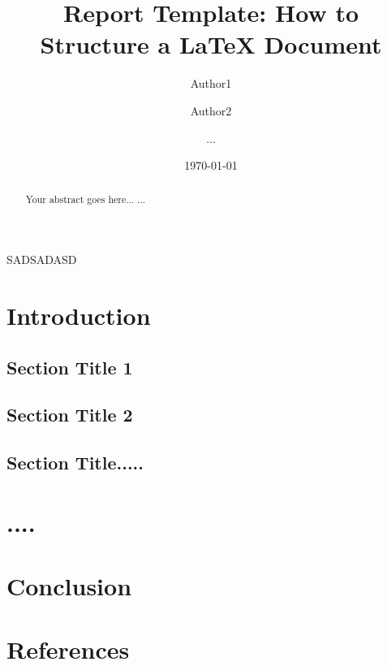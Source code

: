\documentclass[11pt,a4paper]{report}
\begin{document}
\title{Report Template: How to Structure a LaTeX Document}
\author{Author1 \and Author2 \and ...}
\date{\today}
\maketitle

\begin{abstract}
Your abstract goes here...
...
\end{abstract}
SADSADASD
\chapter{Introduction}
\section{Section Title 1}
\section{Section Title 2}
\section{Section Title.....}

\chapter{....}

\chapter{Conclusion}


\chapter*{References}
\end{document}
